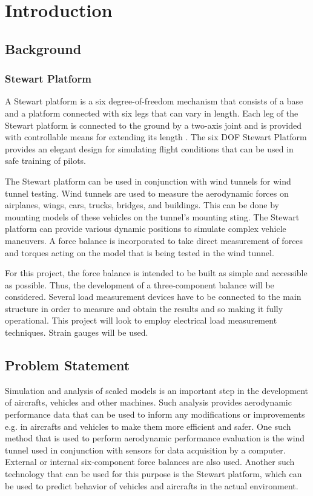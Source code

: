 \chapter{Introduction}
\label{sec:introduction}
\section{Background}
\subsection{Stewart Platform}
A Stewart platform is a six degree-of-freedom mechanism that consists of a base and a platform connected with six legs that can vary in length. Each leg of the Stewart platform is connected to the ground by a two-axis joint and is provided with controllable means for extending its length
\cite{wittenburg2016stewart}. The six DOF Stewart Platform provides an elegant design for simulating flight conditions that can be used in safe training of pilots\cite{stewart1965platform}. 

The Stewart platform can be used in conjunction with wind tunnels for wind tunnel testing. Wind tunnels are used to measure the aerodynamic forces on airplanes, wings, cars, trucks, bridges, and buildings. This can be done by mounting models of these vehicles on the tunnel's mounting sting. The Stewart platform can provide various dynamic positions to simulate complex vehicle maneuvers. A force balance is incorporated to take direct measurement of forces and torques acting on the model that is being tested in the wind tunnel.

For this project, the force balance is intended to be built as simple and accessible as possible. Thus, the development of a three-component balance will be considered. Several load measurement devices have to be connected to the main structure in order to measure and obtain the results and so making it fully operational. This project will look to employ electrical load measurement techniques. Strain gauges will be used.

\section{Problem Statement}
Simulation and analysis of scaled models is an important step in the development of aircrafts, vehicles and other machines. Such analysis provides aerodynamic performance data that can be used to inform any modifications or improvements e.g. in aircrafts and vehicles to make them more efficient and safer. One such method that is used to perform aerodynamic performance evaluation is the wind tunnel used in conjunction with sensors for data acquisition by a computer. External or internal six-component force balances are also used. Another such technology that can be used for this purpose is the Stewart platform, which can be used to predict behavior of vehicles and aircrafts in the actual environment.

